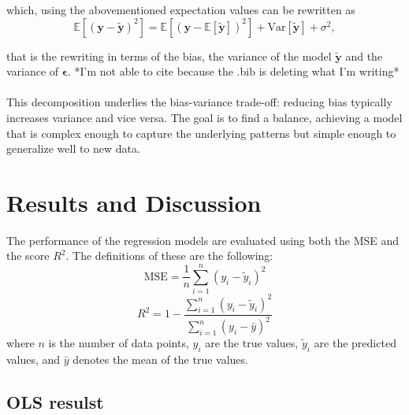 \documentclass[%
 reprint,            %
 amsmath,amssymb,
 aps,
]{revtex4-2}
\begin{document}
which, using the abovementioned expectation values can be rewritten as
$$
\mathbb{E}\left[(\boldsymbol{y}-\boldsymbol{\tilde{y}})^2\right]=\mathbb{E}\left[(\boldsymbol{y}-\mathbb{E}\left[\boldsymbol{\tilde{y}}\right])^2\right]+\mathrm{Var}\left[\boldsymbol{\tilde{y}}\right]+\sigma^2,
$$

that is the rewriting in terms of the bias, the variance of the model $\boldsymbol{\tilde{y}}$ and the variance of $\boldsymbol{\epsilon}$. \cite{misc} *I'm not able to cite because the .bib is deleting what I'm writing* \\\\ 
This decomposition underlies the bias-variance trade-off: reducing bias typically increases variance and vice versa. The goal is to find a balance, achieving a model that is complex enough to capture the underlying patterns but simple enough to generalize well to new data.

\section{Results and Discussion}
The performance of the regression models are evaluated using both the MSE and the score $R^2$. The definitions of these are the following:
$$ \mathrm{MSE} = \frac{1}{n} \sum_{i=1}^{n} \left( y_i - \tilde{y}_i \right)^2$$
$$R^2 = 1 - \frac{\sum_{i=1}^{n} \left( y_i - \tilde{y}_i \right)^2}{\sum_{i=1}^{n} \left( y_i - \bar{y} \right)^2}$$
where $n$ is the number of data points, $y_i$ are the true values, $\tilde{y}_i$ are the predicted values, and $\bar{y}$ denotes the mean of the true values.

\subsection{OLS resulst}
\end{document}
